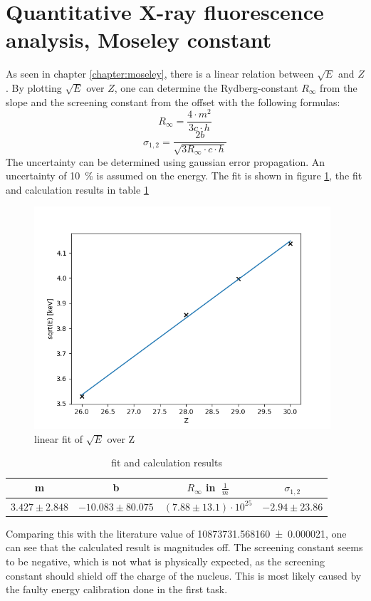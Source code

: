 \section{Quantitative X-ray fluorescence analysis, Moseley constant}
As seen in chapter \ref{chapter:moseley}, there is a linear relation between $\sqrt{E}$ and $Z$. By plotting  $\sqrt{E}$ over $Z$, one can determine the Rydberg-constant $R_\infty$ from the slope and the screening constant from the offset with the following formulas:
$$R_\infty = \frac{4\cdot m^2}{3c\cdot h}$$
$$\sigma_{1,2} = \frac{2b}{\sqrt{3R_\infty\cdot c \cdot h}}$$ The uncertainty can be determined using gaussian error propagation. An uncertainty of \SI{10}{\%} is assumed on the energy.
The fit is shown in figure \ref{fig:ZFIT}, the fit and calculation results in table \ref{tab:ZGIT}
\begin{figure}[H]
    \centering
    \includegraphics[width=110mm,scale=0.5]{MAX/include/lin.png}
    \caption{linear fit of $\sqrt{E}$ over Z}
    \label{fig:ZFIT}
\end{figure}
\begin{table}[H]
    \centering
    \caption{fit and calculation results}
    \begin{tabular}{cccc}
        m & b & $R_\infty$ in $\SI{}{\frac{1}{m}}$ & $\sigma_{1,2}$\\\hline
        $3.427 \pm 2.848$ & $-10.083 \pm 80.075$ & $(7.88 \pm 13.1)\cdot 10^{25}$ & $-2.94 \pm23.86$ \\\hline
    \end{tabular}
    
    \label{tab:ZGIT}
\end{table}
Comparing this with the literature value of \SI{10873731.568160(21)}{}, one can see that the calculated result is magnitudes off. The screening constant seems to be negative, which is not what is physically expected, as the screening constant should shield off the charge of the nucleus. This is most likely caused by the faulty energy calibration done in the first task.



